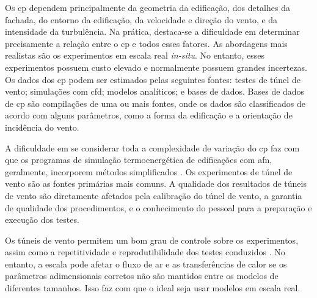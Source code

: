 Os \acrshort{cp} dependem principalmente da geometria da edificação, dos detalhes da fachada, do entorno da edificação, da velocidade e direção do vento, e da intensidade da turbulência. Na prática, destaca-se a dificuldade em determinar precisamente a relação entre o \acrshort{cp} e todos esses fatores. As abordagens mais realistas são os experimentos em escala real \textit{in-situ}. No entanto, esses experimentos possuem custo elevado e normalmente possuem grandes incertezas. 
Os dados dos \acrshort{cp} podem ser estimados pelas seguintes fontes: testes de túnel de vento; simulações com \acrshort{cfd}; modelos analíticos; e bases de dados.
Bases de dados de \acrshort{cp} são compilações de uma ou mais fontes, onde os dados são classificados de acordo com alguns parâmetros, como a forma da edificação e a orientação de incidência do vento. 

A dificuldade em se considerar toda a complexidade de variação do \acrshort{cp} faz com que os programas de simulação termoenergética de edificações com \acrshort{afn}, geralmente, incorporem métodos simplificados \cite{Costola2009}. Os experimentos de túnel de vento são as fontes primárias mais comuns. A qualidade dos resultados de túneis de vento são diretamente afetados pela calibração do túnel de vento, a garantia de qualidade dos procedimentos, e o conhecimento do pessoal para a preparação e execução dos testes.

Os túneis de vento permitem um bom grau de controle sobre os experimentos, assim como a repetitividade e reprodutibilidade dos testes conduzidos \cite{Omrani2017}. No entanto, a escala pode afetar o fluxo de ar e as transferências de calor se os parâmetros adimensionais corretos não são mantidos entre os modelos de diferentes tamanhos. Isso faz com que o ideal seja usar modelos em escala real.

